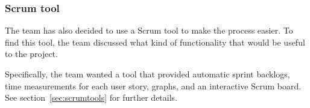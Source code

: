 \subsubsection{Scrum tool}
\label{sec:scrumtool}
The team has also decided to use a Scrum tool to make the process easier.
To find this tool, the team discussed what kind of functionality that would be useful to the project.

Specifically, the team wanted a tool that provided automatic sprint backlogs,
time measurements for each user story, graphs, and an interactive Scrum board.
See section~\ref{sec:scrumtools} for further details.
